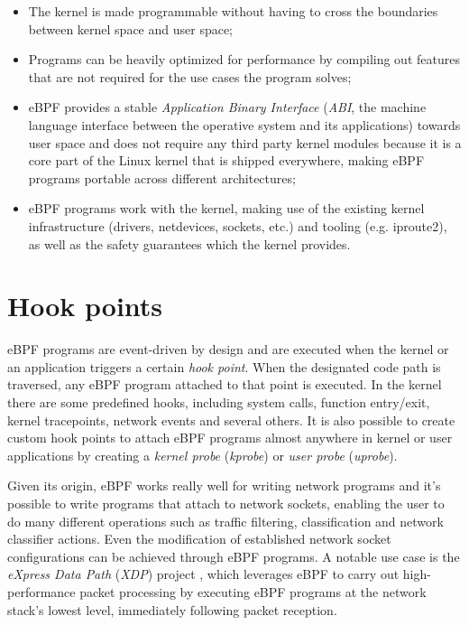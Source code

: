 \begin{itemize}
	\item 
		The kernel is made programmable without having to cross the boundaries between kernel space and user space;
	\item 
		Programs can be heavily optimized for performance by compiling out features that are not required for the use cases the program solves;
	\item 
		eBPF provides a stable \textit{Application Binary Interface} (\textit{ABI}, the machine language interface between the operative system and its applications) towards user space and does not require any third party kernel modules because it is a core part of the Linux kernel that is shipped everywhere, making eBPF programs portable across different architectures;
	\item 
		eBPF programs work with the kernel, making use of the existing kernel infrastructure (drivers, netdevices, sockets, etc.) and tooling (e.g. iproute2), as well as the safety guarantees which the kernel provides.
\end{itemize}

\section{Hook points}

eBPF programs are event-driven by design and are executed when the kernel or an application triggers a certain \textit{hook point}. 
When the designated code path is traversed, any eBPF program attached to that point is executed.
In the kernel there are some predefined hooks, including system calls, function entry/exit, kernel tracepoints, network events and several others.
It is also possible to create custom hook points to attach eBPF programs almost anywhere in kernel or user applications by creating a \textit{kernel probe} (\textit{kprobe}) or \textit{user probe} (\textit{uprobe}).

Given its origin, eBPF works really well for writing network programs and it's possible to write programs that attach to network sockets, enabling the user to do many different operations such as traffic filtering, classification and network classifier actions.
Even the modification of established network socket configurations can be achieved through eBPF programs.
A notable use case is the \textit{eXpress Data Path} (\textit{XDP}) project \cite{XDPWebsite}, which leverages eBPF to carry out high-performance packet processing by executing eBPF programs at the network stack's lowest level, immediately following packet reception.

